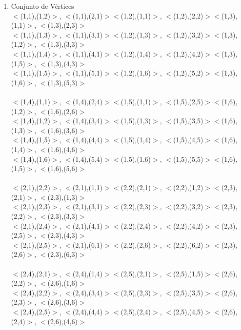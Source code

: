 \documentclass{article}
\begin{document}
\begin{enumerate}
    \item Conjunto de Vértices\\
$<$(1,1),(1,2)$>$, $<$(1,1),(2,1)$>$\qquad 	$<$(1,2),(1,1)$>$, $<$(1,2),(2,2)$>$\qquad	$<$(1,3),(1,1)$>$, $<$(1,3),(2,3)$>$\\
$<$(1,1),(1,3)$>$, $<$(1,1),(3,1)$>$\qquad	$<$(1,2),(1,3)$>$, $<$(1,2),(3,2)$>$\qquad	$<$(1,3),(1,2)$>$, $<$(1,3),(3,3)$>$\\
$<$(1,1),(1,4)$>$, $<$(1,1),(4,1)$>$\qquad	$<$(1,2),(1,4)$>$, $<$(1,2),(4,2)$>$\qquad	$<$(1,3),(1,5)$>$, $<$(1,3),(4,3)$>$\\
$<$(1,1),(1,5)$>$, $<$(1,1),(5,1)$>$\qquad	$<$(1,2),(1,6)$>$, $<$(1,2),(5,2)$>$\qquad	$<$(1,3),(1,6)$>$, $<$(1,3),(5,3)$>$\\
\\
$<$(1,4),(1,1)$>$, $<$(1,4),(2,4)$>$\qquad  $<$(1,5),(1,1)$>$, $<$(1,5),(2,5)$>$\qquad	$<$(1,6),(1,2)$>$, $<$(1,6),(2,6)$>$\\
$<$(1,4),(1,2)$>$, $<$(1,4),(3,4)$>$\qquad	$<$(1,5),(1,3)$>$, $<$(1,5),(3,5)$>$\qquad	$<$(1,6),(1,3)$>$, $<$(1,6),(3,6)$>$\\
$<$(1,4),(1,5)$>$, $<$(1,4),(4,4)$>$\qquad	$<$(1,5),(1,4)$>$, $<$(1,5),(4,5)$>$\qquad	$<$(1,6),(1,4)$>$, $<$(1,6),(4,6)$>$\\
$<$(1,4),(1,6)$>$, $<$(1,4),(5,4)$>$\qquad	$<$(1,5),(1,6)$>$, $<$(1,5),(5,5)$>$\qquad	$<$(1,6),(1,5)$>$, $<$(1,6),(5,6)$>$\\
\\
$<$(2,1),(2,2)$>$, $<$(2,1),(1,1)$>$\qquad	$<$(2,2),(2,1)$>$, $<$(2,2),(1,2)$>$\qquad	$<$(2,3),(2,1)$>$, $<$(2,3),(1,3)$>$\\
$<$(2,1),(2,3)$>$, $<$(2,1),(3,1)$>$\qquad	$<$(2,2),(2,3)$>$, $<$(2,2),(3,2)$>$\qquad	$<$(2,3),(2,2)$>$, $<$(2,3),(3,3)$>$\\
$<$(2,1),(2,4)$>$, $<$(2,1),(4,1)$>$\qquad	$<$(2,2),(2,4)$>$, $<$(2,2),(4,2)$>$\qquad	$<$(2,3),(2,5)$>$, $<$(2,3),(4,3)$>$\\
$<$(2,1),(2,5)$>$, $<$(2,1),(6,1)$>$\qquad	$<$(2,2),(2,6)$>$, $<$(2,2),(6,2)$>$\qquad  $<$(2,3),(2,6)$>$, $<$(2,3),(6,3)$>$\\
\\
$<$(2,4),(2,1)$>$, $<$(2,4),(1,4)$>$\qquad	$<$(2,5),(2,1)$>$, $<$(2,5),(1,5)$>$\qquad	$<$(2,6),(2,2)$>$, $<$(2,6),(1,6)$>$\\
$<$(2,4),(2,2)$>$, $<$(2,4),(3,4)$>$\qquad	$<$(2,5),(2,3)$>$, $<$(2,5),(3,5)$>$\qquad	$<$(2,6),(2,3)$>$, $<$(2,6),(3,6)$>$\\
$<$(2,4),(2,5)$>$, $<$(2,4),(4,4)$>$\qquad	$<$(2,5),(2,4)$>$, $<$(2,5),(4,5)$>$\qquad	$<$(2,6),(2,4)$>$, $<$(2,6),(4,6)$>$\\

\end{enumerate}
\end{document}
